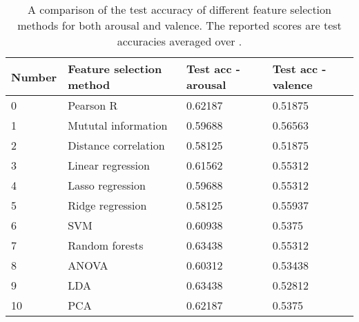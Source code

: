 \begin{table}[H]
\centering
\caption{A comparison of the test accuracy of different feature selection methods for both arousal and valence. The reported scores are test accuracies averaged over \label{genacctable}.} %
\begin{tabular}{llll}
\textbf{Number} & \textbf{Feature selection method} & \textbf{Test acc - arousal} & \textbf{Test acc - valence} \\ \hline
0               & Pearson R                          & 0.62187                             & 0.51875                             \\
1               & Mututal information                            & 0.59688                             & 0.56563                             \\
2               & Distance correlation                             & 0.58125                             & 0.51875                             \\
3               & Linear regression                                & 0.61562                             & 0.55312                             \\
4               & Lasso regression                                & 0.59688                             & 0.55312                             \\
5               & Ridge regression                                & 0.58125                             & 0.55937                             \\
6               & SVM                & 0.60938                             & 0.5375                              \\
7               & Random forests           & 0.63438                             & 0.55312                             \\
8               & ANOVA                             & 0.60312                             & 0.53438                             \\
9               & LDA                               & 0.63438                             & 0.52812                             \\
10              & PCA                               & 0.62187                             & 0.5375                             
\end{tabular}
\end{table}


